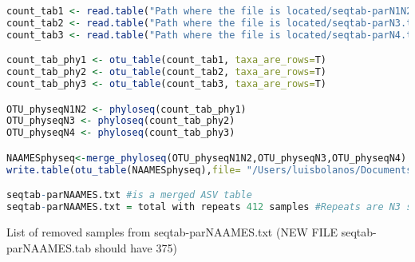 \documentclass{article}
\begin{document}
\begin{lstlisting}[language=R,caption={R processing}]
count_tab1 <- read.table("Path where the file is located/seqtab-parN1N2.txt.tmp", header=T, row.names=1, check.names=F)
count_tab2 <- read.table("Path where the file is located/seqtab-parN3.txt.tmp", header=T, row.names=1, check.names=F)
count_tab3 <- read.table("Path where the file is located/seqtab-parN4.txt.tmp", header=T, row.names=1, check.names=F)

count_tab_phy1 <- otu_table(count_tab1, taxa_are_rows=T)
count_tab_phy2 <- otu_table(count_tab2, taxa_are_rows=T)
count_tab_phy3 <- otu_table(count_tab3, taxa_are_rows=T)

OTU_physeqN1N2 <- phyloseq(count_tab_phy1)
OTU_physeqN3 <- phyloseq(count_tab_phy2)
OTU_physeqN4 <- phyloseq(count_tab_phy3)

NAAMESphyseq<-merge_phyloseq(OTU_physeqN1N2,OTU_physeqN3,OTU_physeqN4)
write.table(otu_table(NAAMESphyseq),file= "/Users/luisbolanos/Documents/OSU_postdoc/NAAMES/MergeAll/seqtab-parNAAMES.txt.tmp", quote=FALSE, sep = "\t")

seqtab-parNAAMES.txt #is a merged ASV table 
seqtab-parNAAMES.txt = total with repeats 412 samples #Repeats are N3 samples re-sequenced in the NAAMES 4 line. So we removed the low quality repeats below and some N2 which we already knew were low quality from the previous paper (Bolanos et al., 2020).
\end{lstlisting}
List of removed samples from seqtab-parNAAMES.txt (NEW FILE seqtab-parNAAMES.tab should have 375)
\end{document}
